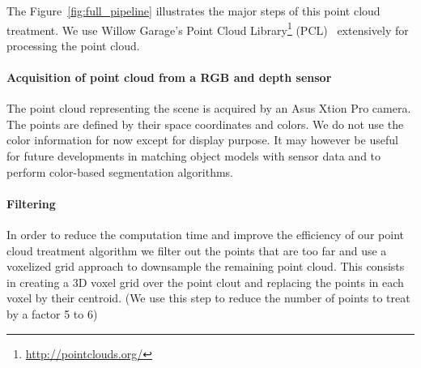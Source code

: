 The Figure~\ref{fig:full_pipeline} illustrates the major steps of this point cloud treatment.
We use Willow Garage's Point Cloud Library\footnote{\url{http://pointclouds.org/}} (PCL)~\cite{rusu:icra:2011} extensively for processing the point cloud.

\paragraph{Acquisition of point cloud from a RGB and depth sensor}

The point cloud representing the scene is acquired by an Asus Xtion Pro camera.
The points are defined by their space coordinates and colors.
We do not use the color information for now except for display purpose.
It may however be useful for future developments in matching object models with sensor data and to perform color-based segmentation algorithms.

\paragraph{Filtering}

In order to reduce the computation time and improve the efficiency of our point cloud treatment algorithm we filter out the points that are too far and use a voxelized grid approach to downsample the remaining point cloud.
This consists in creating a 3D voxel grid over the point clout and replacing the points in each voxel by their centroid.
(We use this step to reduce the number of points to treat by a factor 5 to 6)



